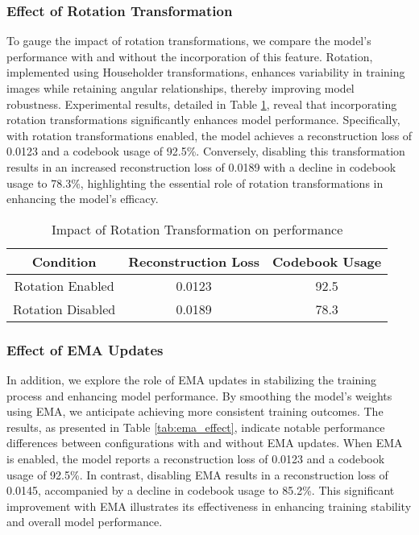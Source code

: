 \subsubsection{Effect of Rotation Transformation} %
To gauge the impact of rotation transformations, we compare the model's performance with and without the incorporation of this feature. Rotation, implemented using Householder transformations, enhances variability in training images while retaining angular relationships, thereby improving model robustness. Experimental results, detailed in Table \ref{tab:rotation_effect}, reveal that incorporating rotation transformations significantly enhances model performance. Specifically, with rotation transformations enabled, the model achieves a reconstruction loss of 0.0123 and a codebook usage of 92.5\%. Conversely, disabling this transformation results in an increased reconstruction loss of 0.0189 with a decline in codebook usage to 78.3\%, highlighting the essential role of rotation transformations in enhancing the model's efficacy.

\begin{table}[h]
    \centering
    \begin{tabular}{|c|c|c|}
        \hline
        Condition & Reconstruction Loss & Codebook Usage \\
        \hline
        Rotation Enabled  & 0.0123 & 92.5 \\
        Rotation Disabled & 0.0189 & 78.3 \\
        \hline
    \end{tabular}
    \caption{Impact of Rotation Transformation on performance}
    \label{tab:rotation_effect}
\end{table}

\subsubsection{Effect of EMA Updates} %
In addition, we explore the role of EMA updates in stabilizing the training process and enhancing model performance. By smoothing the model's weights using EMA, we anticipate achieving more consistent training outcomes. The results, as presented in Table \ref{tab:ema_effect}, indicate notable performance differences between configurations with and without EMA updates. When EMA is enabled, the model reports a reconstruction loss of 0.0123 and a codebook usage of 92.5\%. In contrast, disabling EMA results in a reconstruction loss of 0.0145, accompanied by a decline in codebook usage to 85.2\%. This significant improvement with EMA illustrates its effectiveness in enhancing training stability and overall model performance.


